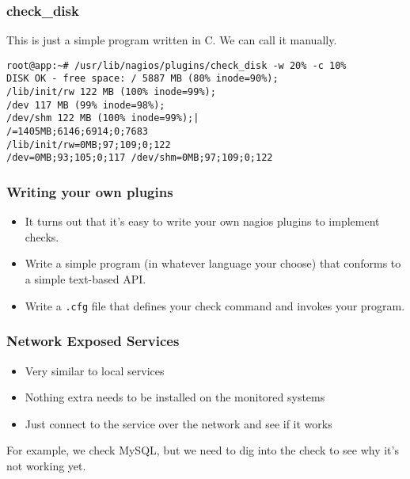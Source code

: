 \documentclass[10pt]{beamer}
\begin{document}
\begin{frame}[fragile]
  \frametitle{check\_disk}

  This is just a simple program written in C.  We can call it manually.
\begin{Verbatim}[commandchars=\\\[\]]
root@app:~# /usr/lib/nagios/plugins/check_disk -w 20% -c 10%
DISK OK - free space: / 5887 MB (80% inode=90%);
/lib/init/rw 122 MB (100% inode=99%);
/dev 117 MB (99% inode=98%);
/dev/shm 122 MB (100% inode=99%);|
/=1405MB;6146;6914;0;7683
/lib/init/rw=0MB;97;109;0;122
/dev=0MB;93;105;0;117 /dev/shm=0MB;97;109;0;122
\end{Verbatim}
\end{frame}


\begin{frame}
  \frametitle{Writing your own plugins}


\begin{itemize}
  \item It turns out that it's easy to write your own nagios plugins to 
	  implement checks.
  \item Write a simple program (in whatever language your choose) that 
	  conforms to a simple text-based API.
  \item Write a \texttt{.cfg} file that defines your check command and invokes
		  your program.
\end{itemize}


\end{frame}
\begin{frame}
  \frametitle{Network Exposed Services}


\begin{itemize}
  \item Very similar to local services
  \item Nothing extra needs to be installed on the monitored systems
  \item Just connect to the service over the network and see if it works
\end{itemize}

For example, we check MySQL, but we need to dig into the check to see why
it's not working yet.

\end{frame}
\end{document}
